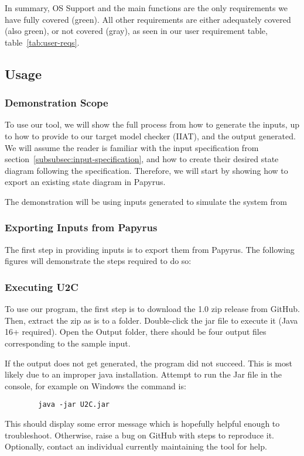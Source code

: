 \documentclass[11pt]{article}
\begin{document}
    In summary, OS Support and the main functions are the only requirements we have fully covered (green).
    All other requirements are either adequately covered (also green), or not covered (gray),
    as seen in our user requirement table, table~\ref{tab:user-reqs}.


    \subsection{Usage}\label{subsec:usage}
    \subsubsection{Demonstration Scope}
    To use our tool, we will show the full process from how to generate the inputs,
    up to how to provide to our target model checker (IIAT), and the output generated.
    We will assume the reader is familiar with the input specification from section~\ref{subsubsec:input-specification},
    and how to create their desired state diagram following the specification.
    Therefore, we will start by showing how to export an existing state diagram in Papyrus.

    The demonstration will be using inputs generated to simulate the system from %

    \subsubsection{Exporting Inputs from Papyrus}
    The first step in providing inputs is to export them from Papyrus.
    The following figures will demonstrate the steps required to do so:

    \subsubsection{Executing U2C}
    To use our program, the first step is to download the 1.0 zip release from GitHub.
    Then, extract the zip as is to a folder.
    Double-click the jar file to execute it (Java 16+ required).
    Open the Output folder, there should be four output files corresponding to the sample input.

    If the output does not get generated, the program did not succeed.
    This is most likely due to an improper java installation.
    Attempt to run the Jar file in the console, for example on Windows the command is:
    \begin{verbatim}
        java -jar U2C.jar
    \end{verbatim}
    This should display some error message which is hopefully helpful enough to troubleshoot.
    Otherwise, raise a bug on GitHub with steps to reproduce it.
    Optionally, contact an individual currently maintaining the tool for help.
\end{document}
